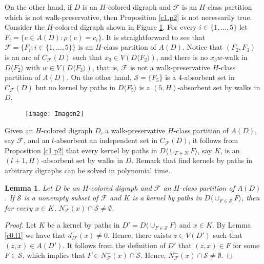 \documentclass[10pt,a4paper]{article}
\newtheorem{lemma}[theorem]{Lemma}
\begin{document}
On the other hand, if $D$ is an $H$-colored digraph and $\mathscr{F}$ is an $H$-class partition which is not walk-preservative, then Proposition \ref{c1.p2} is not necessarily true. Consider the $H$-colored digraph shown in Figure \ref{fig2}. For every $i \in \{1, \ldots , 5 \}$ let $F_{i}=\{ e \in A(D): \rho (e)=c_{i} \}$. It is straightforward to see that $\mathscr{F}=\{ F_{i} : i \in \{ 1, \ldots , 5\}\}$ is an $H$-class partition of $A(D)$. Notice that $(F_{2}, F_{3})$ is an arc of $C_{\mathscr{F}}(D)$ such that $x_{3} \in V(D\langle F_{2} \rangle)$, and there is no $x_{3}w$-walk in $D\langle F_{2} \rangle$ with $w \in V(D \langle F_{3} \rangle )$, that is, $\mathscr{F}$ is not a walk-preservative $H$-class partition of $A(D)$. On the other hand, $\mathcal{S}=\{F_{5} \}$ is a $4$-absorbent set in $C_{\mathscr{F}}(D)$ but no kernel by paths in $D\langle F_{5} \rangle$ is a $(5, H)$-absorbent set by walks in $D$.

\begin{figure}[ht]
\centering
\texttt{[image: Imagen2]}
\caption{\label{fig2}}
\end{figure}

Given an $H$-colored digraph $D$, a walk-preservative $H$-class partition of $A(D)$, say $\mathscr{F}$, and an $l$-absorbent an independent set in $C_{\mathscr{F}}(D)$,  it follows from Proposition \ref{c1.p2} that every kernel by paths in $D\langle \cup _{F \in N } F \rangle$, say $K$, is an $(l+1,H)$-absorbent set by walks in $D$. Remark that find kernels by paths in arbitrary digraphs can be solved in polynomial time.

\begin{lemma}
\label{c1.l0}
Let $D$ be an $H$-colored digraph and $\mathscr{F}$ an $H$-class partition of $A(D)$. If $\mathcal{S}$ is a nonempty subset of $\mathscr{F}$ and $K$ is a kernel by paths in $D\langle \cup _{F \in \mathcal{S}} F \rangle$, then  for every $x \in K$, $N^{-}_{\mathscr{F}}(x) \cap \mathcal{S} \neq \emptyset$.
\end{lemma}
\begin{proof}
Let $K$ be a kernel by paths in $D'=D\langle \cup _{F \in \mathcal{S}} F \rangle$ and $x \in K$. By Lemma \ref{c0.l1} we have that $d^{-}_{D'}(x) \neq 0$. Hence, there exists $z \in V(D')$ such that $(z,x) \in A(D')$. It follows from the definition of $D'$ that $(z,x) \in F$ for some $F \in \mathcal{S}$, which implies that $F\in N^{-}_{\mathscr{F}}(x) \cap \mathcal{S}$. Hence, $N^{-}_{\mathscr{F}}(x) \cap \mathcal{S} \neq \emptyset$.
\end{proof}
\end{document}
